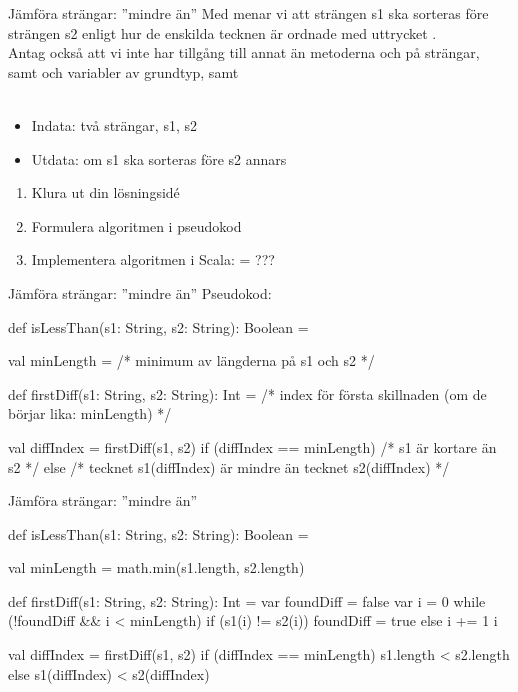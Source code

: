\begin{Slide}{Jämföra strängar: ''mindre än''}\SlideFontSmall
Med  menar vi att strängen s1 ska sorteras före strängen s2 enligt hur de enskilda tecknen är ordnade med uttrycket . \\
Antag också att vi inte har tillgång till annat än metoderna  och  på strängar, samt   och variabler av grundtyp, samt 
\\\\
\begin{itemize}
\item Indata: två strängar, s1, s2
\item Utdata:  om s1 ska sorteras före s2 annars 
\end{itemize}
\begin{enumerate}
\item Klura ut din lösningsidé
\item Formulera algoritmen i pseudokod
\item Implementera algoritmen i Scala:  = ???
\end{enumerate}
\end{Slide}

\begin{Slide}{Jämföra strängar: ''mindre än''}\SlideFontSmall
Pseudokod:
\begin{Code}
def isLessThan(s1: String, s2: String): Boolean = {

  val minLength = /* minimum av längderna på s1 och s2 */

  def firstDiff(s1: String, s2: String): Int =
    /* index för första skillnaden (om de börjar lika: minLength) */

  val diffIndex = firstDiff(s1, s2)
  if (diffIndex == minLength) /* s1 är kortare än s2 */
  else /* tecknet s1(diffIndex) är mindre än tecknet s2(diffIndex) */
}
\end{Code}
\end{Slide}

\begin{Slide}{Jämföra strängar: ''mindre än''}\SlideFontSmall
\begin{Code}
def isLessThan(s1: String, s2: String): Boolean = {

  val minLength = math.min(s1.length, s2.length)

  def firstDiff(s1: String, s2: String): Int = {
    var foundDiff = false
    var i = 0
    while (!foundDiff && i < minLength)
      if (s1(i) != s2(i)) foundDiff = true
      else i += 1
    i
  }

  val diffIndex = firstDiff(s1, s2)
  if (diffIndex == minLength) s1.length < s2.length
  else s1(diffIndex) < s2(diffIndex)
}
\end{Code}
\end{Slide}

